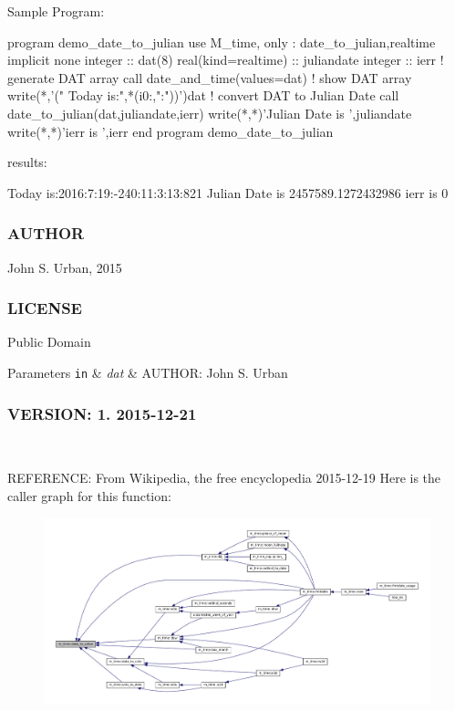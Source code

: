 \begin{DoxyVerb}Sample Program:

 program demo_date_to_julian
 use M_time, only : date_to_julian,realtime
 implicit none
 integer             :: dat(8)
 real(kind=realtime) :: juliandate
 integer             :: ierr
    ! generate DAT array
    call date_and_time(values=dat)
    ! show DAT array
    write(*,'(" Today is:",*(i0:,":"))')dat
    ! convert DAT to Julian Date
    call date_to_julian(dat,juliandate,ierr)
    write(*,*)'Julian Date is ',juliandate
    write(*,*)'ierr is ',ierr
 end program demo_date_to_julian

results:

 Today is:2016:7:19:-240:11:3:13:821
 Julian Date is    2457589.1272432986
 ierr is            0
\end{DoxyVerb}


\subsubsection*{A\+U\+T\+H\+OR}

John S. Urban, 2015 \subsubsection*{L\+I\+C\+E\+N\+SE}

Public Domain


\begin{DoxyParams}[1]{Parameters}
\mbox{\tt in}  & {\em dat} & A\+U\+T\+H\+OR\+: John S. Urban \subsubsection*{V\+E\+R\+S\+I\+ON\+: 1. 2015-\/12-\/21}\\
\hline
\end{DoxyParams}
R\+E\+F\+E\+R\+E\+N\+CE\+: From Wikipedia, the free encyclopedia 2015-\/12-\/19 Here is the caller graph for this function\+:
\nopagebreak
\begin{figure}[H]
\begin{center}
\leavevmode
\includegraphics[width=350pt]{namespacem__time_acfdc970b4154b0c15bd33727636e3992_icgraph}
\end{center}
\end{figure}
\mbox{\label{namespacem__time_aed245c691853279ebf0ce899dec9caa9}} 

